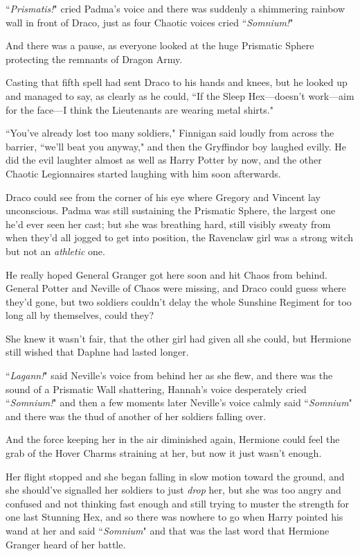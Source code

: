 ``\emph{Prismatis!}" cried Padma's voice and there was suddenly a shimmering rainbow wall in front of Draco, just as four Chaotic voices cried ``\emph{Somnium!}"

And there was a pause, as everyone looked at the huge Prismatic Sphere protecting the remnants of Dragon Army.

Casting that fifth spell had sent Draco to his hands and knees, but he looked up and managed to say, as clearly as he could, ``If the Sleep Hex—doesn't work—aim for the face—I think the Lieutenants are wearing metal shirts."

``You've already lost too many soldiers," Finnigan said loudly from across the barrier, ``we'll beat you anyway," and then the Gryffindor boy laughed evilly. He did the evil laughter almost as well as Harry Potter by now, and the other Chaotic Legionnaires started laughing with him soon afterwards.

Draco could see from the corner of his eye where Gregory and Vincent lay unconscious. Padma was still sustaining the Prismatic Sphere, the largest one he'd ever seen her cast; but she was breathing hard, still visibly sweaty from when they'd all jogged to get into position, the Ravenclaw girl was a strong witch but not an \emph{athletic} one.

He really hoped General Granger got here soon and hit Chaos from behind. General Potter and Neville of Chaos were missing, and Draco could guess where they'd gone, but two soldiers couldn't delay the whole Sunshine Regiment for too long all by themselves, could they?

\later

She knew it wasn't fair, that the other girl had given all she could, but Hermione still wished that Daphne had lasted longer.

``\emph{Lagann!}" said Neville's voice from behind her as she flew, and there was the sound of a Prismatic Wall shattering, Hannah's voice desperately cried ``\emph{Somnium!}" and then a few moments later Neville's voice calmly said ``\emph{Somnium}" and there was the thud of another of her soldiers falling over.

And the force keeping her in the air diminished again, Hermione could feel the grab of the Hover Charms straining at her, but now it just wasn't enough.

Her flight stopped and she began falling in slow motion toward the ground, and she should've signalled her soldiers to just \emph{drop} her, but she was too angry and confused and not thinking fast enough and still trying to muster the strength for one last Stunning Hex, and so there was nowhere to go when Harry pointed his wand at her and said ``\emph{Somnium}" and that was the last word that Hermione Granger heard of her battle.

